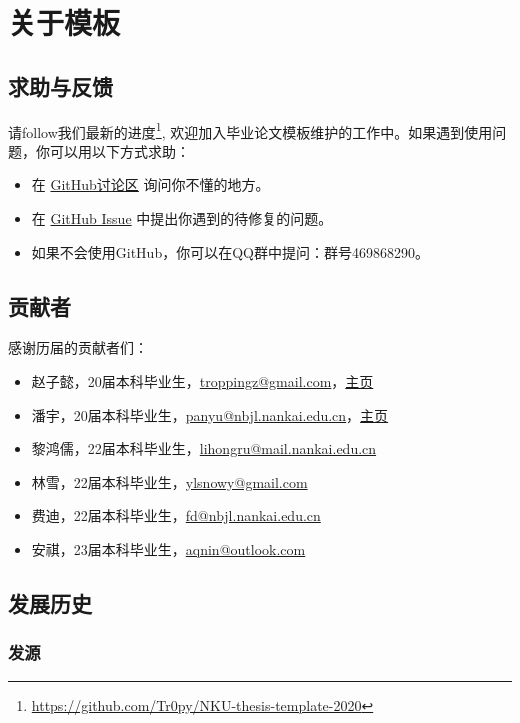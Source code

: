 \section{关于模板}

\subsection{求助与反馈}

请follow我们最新的进度\footnote{\url{https://github.com/Tr0py/NKU-thesis-template-2020}}, 
欢迎加入毕业论文模板维护的工作中。如果遇到使用问题，你可以用以下方式求助：
\begin{itemize}
  \item 在 \href{https://github.com/Tr0py/NKU-thesis-template-2020/discussions}{GitHub讨论区} 询问你不懂的地方。
  \item 在 \href{https://github.com/Tr0py/NKU-thesis-template-2020/issues}{GitHub Issue} 中提出你遇到的待修复的问题。
  \item 如果不会使用GitHub，你可以在QQ群中提问：群号469868290。
\end{itemize}

\subsection{贡献者}

感谢历届的贡献者们：
\begin{itemize}
  \item 赵子懿，20届本科毕业生，\url{troppingz@gmail.com}，\href{https://tr0py.github.io/}{主页}
  \item 潘宇，20届本科毕业生，\url{panyu@nbjl.nankai.edu.cn}，\href{https://nbjl.nankai.edu.cn/2019/0513/c19244a264683/page.htm}{主页}
  \item 黎鸿儒，22届本科毕业生，\url{lihongru@mail.nankai.edu.cn}
  \item 林雪，22届本科毕业生，\url{ylsnowy@gmail.com}
  \item 费迪，22届本科毕业生，\url{fd@nbjl.nankai.edu.cn}
  \item 安祺，23届本科毕业生，\url{aqnin@outlook.com}
\end{itemize}

\subsection{发展历史}

\subsubsection{发源}

